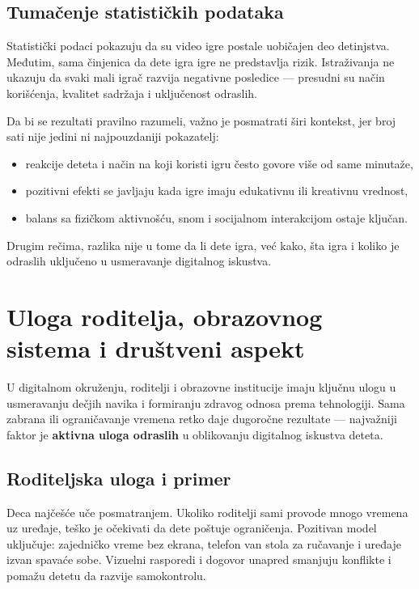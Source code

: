 \documentclass[a4paper,12pt]{article}
\begin{document}
\subsection*{Tumačenje statističkih podataka}

Statistički podaci pokazuju da su video igre postale uobičajen deo detinjstva. Međutim, sama činjenica da dete igra igre ne predstavlja rizik. Istraživanja ne ukazuju da svaki mali igrač razvija negativne posledice — presudni su način korišćenja, kvalitet sadržaja i uključenost odraslih.

Da bi se rezultati pravilno razumeli, važno je posmatrati širi kontekst, jer broj sati nije jedini ni najpouzdaniji pokazatelj:
\begin{itemize}
    \item reakcije deteta i način na koji koristi igru često govore više od same minutaže,
    \item pozitivni efekti se javljaju kada igre imaju edukativnu ili kreativnu vrednost,
    \item balans sa fizičkom aktivnošću, snom i socijalnom interakcijom ostaje ključan.
\end{itemize}

\bigskip

Drugim rečima, razlika nije u tome da li dete igra, već kako, šta igra i koliko je odraslih uključeno u usmeravanje digitalnog iskustva.



\section{Uloga roditelja, obrazovnog sistema i društveni aspekt}

U digitalnom okruženju, roditelji i obrazovne institucije imaju ključnu ulogu u usmeravanju dečjih navika i formiranju zdravog odnosa prema tehnologiji. 
Sama zabrana ili ograničavanje vremena retko daje dugoročne rezultate — najvažniji faktor je \textbf{aktivna uloga odraslih} u oblikovanju digitalnog iskustva deteta.

\subsection*{Roditeljska uloga i primer}
Deca najčešće uče posmatranjem. Ukoliko roditelji sami provode mnogo vremena uz uređaje, teško je očekivati da dete poštuje ograničenja. 
Pozitivan model uključuje: zajedničko vreme bez ekrana, telefon van stola za ručavanje i uređaje izvan spavaće sobe. Vizuelni rasporedi i dogovor unapred smanjuju konflikte i pomažu detetu da razvije samokontrolu.
\end{document}
